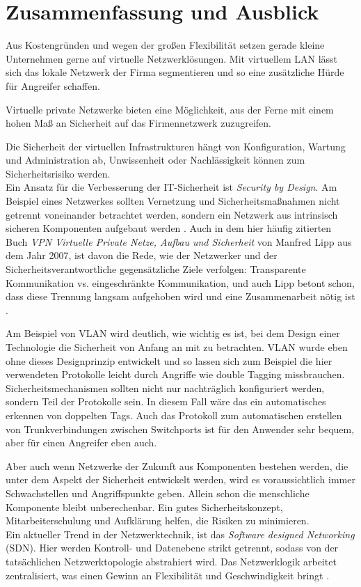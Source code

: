 \chapter{Zusammenfassung und Ausblick}

Aus Kostengründen und wegen der großen Flexibilität setzen gerade kleine Unternehmen gerne auf virtuelle Netzwerklösungen. Mit virtuellem LAN lässt sich das lokale Netzwerk der Firma segmentieren und so eine zusätzliche Hürde für Angreifer schaffen.

Virtuelle private Netzwerke bieten eine Möglichkeit, aus der Ferne mit einem hohen Maß an Sicherheit auf das Firmennetzwerk zuzugreifen. 

Die Sicherheit der virtuellen Infrastrukturen hängt von Konfiguration, Wartung und Administration ab, Unwissenheit oder Nachlässigkeit können zum Sicherheitsrisiko werden. \\   

Ein Ansatz für die Verbesserung der IT-Sicherheit ist \emph{Security by Design}. Am Beispiel eines Netzwerkes sollten Vernetzung und Sicherheitsmaßnahmen nicht getrennt voneinander betrachtet werden, sondern ein Netzwerk aus intrinsisch sicheren Komponenten aufgebaut werden \cite{nicholson2018blurring}. Auch in dem hier häufig zitierten Buch \emph{VPN Virtuelle Private Netze, Aufbau und Sicherheit} von Manfred Lipp aus dem Jahr 2007, ist davon die Rede, wie der Netzwerker und der Sicherheitsverantwortliche gegensätzliche Ziele verfolgen: Transparente Kommunikation vs. eingeschränkte Kommunikation, und auch Lipp betont schon, dass diese Trennung langsam aufgehoben wird und eine Zusammenarbeit nötig ist \cite{lipp2007vpn}. 

Am Beispiel von VLAN wird deutlich, wie wichtig es ist, bei dem Design einer Technologie die Sicherheit von Anfang an mit zu betrachten. VLAN wurde eben ohne dieses Designprinzip entwickelt und so lassen sich zum Beispiel die hier verwendeten Protokolle leicht durch Angriffe wie double Tagging missbrauchen. Sicherheitsmechanismen sollten nicht nur nachträglich konfiguriert werden, sondern Teil der Protokolle sein. In diesem Fall wäre das ein automatisches erkennen von doppelten Tags. Auch das Protokoll zum automatischen erstellen von Trunkverbindungen zwischen Switchports ist für den Anwender sehr bequem, aber für einen Angreifer eben auch. 

Aber auch wenn Netzwerke der Zukunft aus Komponenten bestehen werden, die unter dem Aspekt der Sicherheit entwickelt werden, %
wird es voraussichtlich immer Schwachstellen und Angriffspunkte geben. Allein schon die menschliche Komponente bleibt unberechenbar. Ein gutes Sicherheitskonzept, Mitarbeiterschulung und Aufklärung helfen, die Risiken zu minimieren.\\

Ein aktueller Trend  in der Netzwerktechnik, ist das \emph{Software designed Networking}  (SDN). 
Hier werden Kontroll- und Datenebene strikt getrennt, sodass von der tatsächlichen Netzwerktopologie abstrahiert wird. Das Netzwerklogik arbeitet zentralisiert, was einen Gewinn an Flexibilität und Geschwindigkeit bringt \cite{10.1007/978-3-319-64701-2_39}. 


